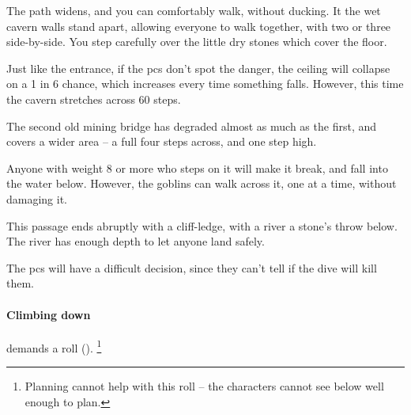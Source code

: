 \begin{multicols}{2}
\begin{boxtext}
  The path widens, and you can comfortably walk, without ducking.
  It the wet cavern walls stand apart, allowing everyone to walk together, with two or three side-by-side.
  You step carefully over the little dry stones which cover the floor.
\end{boxtext}

\caveIn

Just like the entrance, if the \glspl{pc} don't spot the danger, the ceiling will collapse on a 1 in 6 chance, which increases every time something falls.
However, this time the cavern stretches across 60 steps.




\begin{exampletext}
  The second old mining bridge has degraded almost as much as the first, and covers a wider area -- a full four \glspl{step} across, and one \gls{step} high.
\end{exampletext}

Anyone with \gls{weight} 8 or more who steps on it will make it break, and fall into the water below.
However, the goblins can walk across it, one at a time, without damaging it.





This passage ends abruptly with a cliff-ledge, with a river a stone's throw below.
The river has enough depth to let anyone land safely.

The \glspl{pc} will have a difficult decision, since they can't tell if the dive will kill them.

\paragraph{Climbing down}
demands a  roll (\tn[9]).%
\footnote{Planning cannot help with this roll -- the characters cannot see below well enough to plan.}


\end{multicols}
